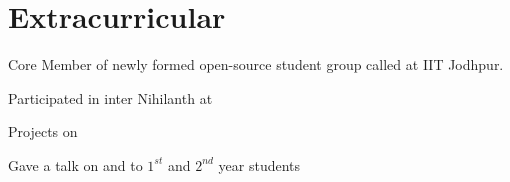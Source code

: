 \documentclass[]{deedy-resume-openfont}
\begin{document}
\begin{minipage}[t]{0.67\textwidth}

\section{Extracurricular} 
\begin{bulletedlist}
\item Core Member of newly formed open-source student group called  at IIT Jodhpur.
\item Participated in inter  Nihilanth at 
\item {} Projects on 
\item Gave a talk on  and  to $1^{st}$  and $2^{nd}$ year students

\end{bulletedlist}
\end{minipage} 
\end{document}
